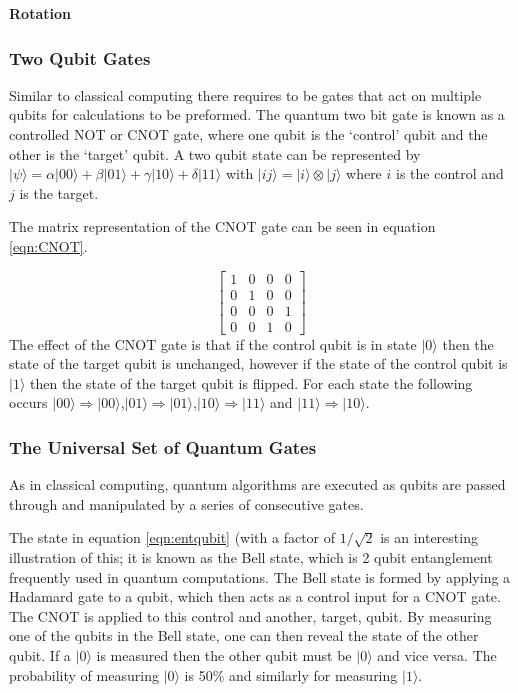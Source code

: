 {\bf Rotation}

\subsubsection{Two Qubit Gates}\label{sec:twoqubit}
Similar to classical computing there requires to be gates that act on multiple qubits for calculations to be preformed. 
The quantum two bit gate is known as a controlled NOT or CNOT gate, where one qubit is the `control' qubit and the other is the `target' qubit. \cite{nielsen_quantum_2010}
A two qubit state can be represented by $|\psi\rangle = \alpha |00\rangle + \beta|01\rangle + \gamma|10\rangle + \delta |11\rangle$ with $|ij\rangle=|i\rangle \otimes |j\rangle$ where $i$ is the control and $j$ is the target. 

The matrix representation of the CNOT gate can be seen in equation \ref{eqn:CNOT}.

\begin{equation}\label{eqn:CNOT}
    \begin{bmatrix}
1 & 0 & 0 & 0 \\
0 & 1 & 0 & 0 \\
0 & 0 & 0 & 1 \\
0 & 0 & 1 & 0 
\end{bmatrix}  
\end{equation}
The effect of the CNOT gate is that if the control qubit is in state $|0\rangle$ then the state of the target qubit is unchanged, however if the state of the control qubit is $|1\rangle$ then the state of the target qubit is flipped. 
For each state the following occurs $|00\rangle \Rightarrow |00\rangle$,$ |01\rangle \Rightarrow |01\rangle$,$ |10\rangle \Rightarrow |11\rangle$ and $|11\rangle \Rightarrow |10\rangle$.


\subsubsection{The Universal Set of Quantum Gates}
As in classical computing, quantum algorithms are executed as qubits are passed through and manipulated by a series of consecutive gates. 

The state in equation \ref{eqn:entqubit} (with a factor of $1/\sqrt{2}$ is an interesting illustration of this; it is known as the Bell state, which is 2 qubit entanglement frequently used in quantum computations. The Bell state is formed by applying a Hadamard gate to a qubit, which then acts as a control input for a CNOT gate. The CNOT is applied to this control and another, target, qubit. \cite{mermin_quantum_2007} 
By measuring one of the qubits in the Bell state, one can then reveal the state of the other qubit. If a $|0\rangle$ is measured then the other qubit must be $|0\rangle$ and vice versa. The probability of measuring $|0\rangle$ is 50$\%$ and similarly for measuring $|1\rangle$. 


